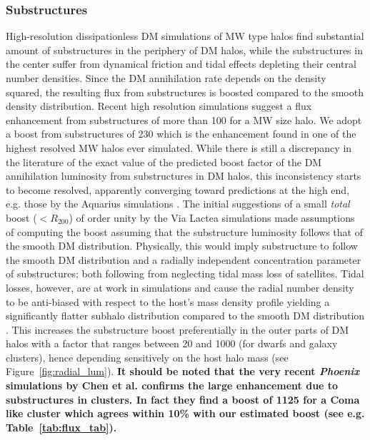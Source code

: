 \documentclass[10pt,aps,pra,reprint,amsmath,amsfonts,amssymb,showpacs,nofootinbib,floatfix]{revtex4-1}
\def\C#1{{\bf #1}}
\begin{document}
\subsubsection{Substructures}
\label{sect:subst}
High-resolution dissipationless DM simulations of MW type halos find
substantial amount of substructures in the periphery of DM halos,
while the substructures in the center suffer from dynamical friction
and tidal effects depleting their central number densities. Since the
DM annihilation rate depends on the density squared, the resulting
flux from substructures is boosted compared to the smooth density
distribution. Recent high resolution simulations suggest a flux
enhancement from substructures of more than 100
\cite{2008MNRAS.391.1685S, 2010ApJ...718..899A} for a MW size halo.
We adopt a boost from substructures of 230 which is the enhancement
found in one of the highest resolved MW halos ever simulated. While
there is still a discrepancy in the literature of the exact value of
the predicted boost factor of the DM annihilation luminosity from
substructures in DM halos, this inconsistency starts to become
resolved, apparently converging toward predictions at the high end,
e.g. those by the Aquarius simulations \protect
\cite{2008MNRAS.391.1685S, 2008Natur.456...73S}. The initial
suggestions of a small {\em total} boost ($<R_{200}$) of order unity
by the Via Lactea simulations \cite{2008JPhCS.125a2008K} made
assumptions of computing the boost assuming that the substructure
luminosity follows that of the smooth DM distribution. Physically,
this would imply substructure to follow the smooth DM distribution and
a radially independent concentration parameter of substructures; both
following from neglecting tidal mass loss of satellites. Tidal losses,
however, are at work in simulations and cause the radial number
density to be anti-biased with respect to the host's mass density
profile yielding a significantly flatter subhalo distribution compared
to the smooth DM distribution \cite{2010ApJ...718..899A}. This
increases the substructure boost preferentially in the outer parts of
DM halos with a factor that ranges between 20 and 1000 (for dwarfs and
galaxy clusters), hence depending sensitively on the host halo mass
(see Figure~\ref{fig:radial_lum}). \C{It should be noted that the very
  recent {\it Phoenix} simulations by Chen et
  al. \cite{2011arXiv1107.1916G} confirms the large enhancement due to
  substructures in clusters. In fact they find a boost of 1125 for a
  Coma like cluster which agrees within 10\% with our estimated boost
  (see e.g. Table~\ref{tab:flux_tab}).}
\end{document}
